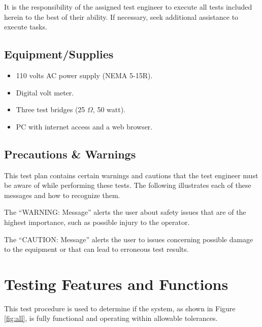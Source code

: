 \documentclass{article}
\begin{document}
It is the responsibility of the assigned test engineer to execute all tests
included herein to the best of their ability. If necessary, seek additional
assistance to execute tasks.


\subsection{Equipment/Supplies}

\begin{itemize}
\item 110 volts AC power supply (NEMA 5-15R).
\item Digital volt meter.
\item Three test bridges (25 $\Omega$, 50 watt).
\item PC with internet access and a web browser.
\end{itemize}

\subsection{Precautions \& Warnings}

This test plan contains certain warnings and cautions that the test
engineer must be aware of while performing these tests.
The following illustrates each of these messages and how to recognize them.


The ``WARNING: Message'' alerts the user about safety issues that are of
the highest importance, such as possible injury to the operator.


The ``CAUTION: Message'' alerts the user to issues concerning possible
damage to the equipment or that can lead to erroneous test results.


\pagebreak

\section{Testing Features and Functions}

This test procedure is used to determine if the system,
as shown in Figure \ref{fig:all}, is fully functional and operating
within allowable tolerances.
\end{document}
